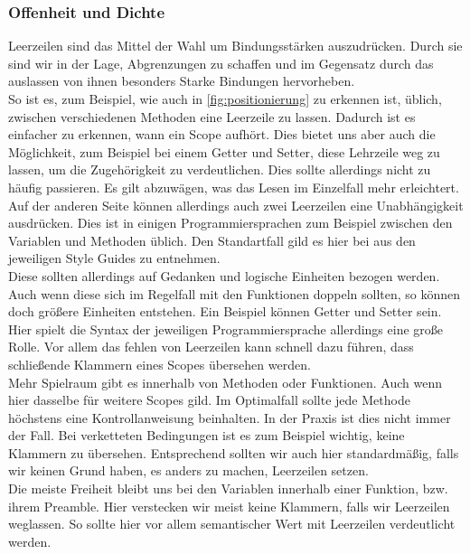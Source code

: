         \subsubsection{Offenheit und Dichte}
            Leerzeilen sind das Mittel der Wahl um  Bindungsstärken auszudrücken.
            Durch sie sind wir in der Lage, Abgrenzungen zu schaffen und im Gegensatz durch das auslassen von ihnen besonders Starke Bindungen hervorheben.\\
            So ist es, zum Beispiel, wie auch in \ref{fig:positionierung} zu erkennen ist, üblich, zwischen verschiedenen Methoden eine Leerzeile zu lassen.
            Dadurch ist es einfacher zu erkennen, wann ein Scope aufhört.
            Dies bietet uns aber auch die Möglichkeit, zum Beispiel bei einem Getter und Setter, diese Lehrzeile weg zu lassen, um die Zugehörigkeit zu verdeutlichen.
            Dies sollte allerdings nicht zu häufig passieren.
            Es gilt abzuwägen, was das Lesen im Einzelfall mehr erleichtert.\\
            Auf der anderen Seite können allerdings auch zwei Leerzeilen eine Unabhängigkeit ausdrücken.
            Dies ist in einigen Programmiersprachen zum Beispiel zwischen den Variablen und Methoden üblich.
            Den Standartfall gild es hier bei aus den jeweiligen Style Guides zu entnehmen.\\
            Diese  sollten allerdings auf Gedanken und logische Einheiten bezogen werden.
            Auch wenn diese sich im Regelfall mit den Funktionen doppeln sollten, so können doch größere Einheiten entstehen.
            Ein Beispiel können Getter und Setter sein.
            Hier spielt die Syntax der jeweiligen Programmiersprache allerdings eine große Rolle.
            Vor allem das fehlen von Leerzeilen kann schnell dazu führen, dass schließende Klammern eines Scopes übersehen werden.\\
            Mehr Spielraum gibt es innerhalb von Methoden oder Funktionen.
            Auch wenn hier dasselbe für weitere Scopes gild.
            Im Optimalfall sollte jede Methode höchstens eine Kontrollanweisung beinhalten.
            In der Praxis ist dies nicht immer der Fall.
            Bei verketteten Bedingungen ist es zum Beispiel wichtig, keine Klammern zu übersehen.
            Entsprechend sollten wir auch hier standardmäßig, falls wir keinen Grund haben, es anders zu machen, Leerzeilen setzen.\\
            Die meiste Freiheit bleibt uns bei den Variablen innerhalb einer Funktion, bzw. ihrem Preamble.
            Hier verstecken wir meist keine Klammern, falls wir Leerzeilen weglassen.
            So sollte hier vor allem semantischer Wert mit Leerzeilen verdeutlicht werden.


